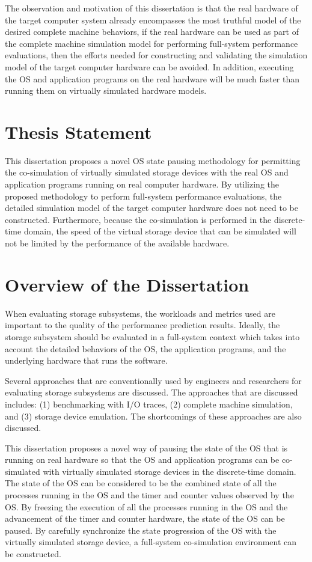 The observation and motivation of this dissertation is that the real hardware of the target computer system already encompasses the most truthful model of the desired complete machine behaviors, if the real hardware can be used as part of the complete machine simulation model for performing full-system performance evaluations, then the efforts needed for constructing and validating the simulation model of the target computer hardware can be avoided. In addition, executing the OS and application programs on the real hardware will be much faster than running them on virtually simulated hardware models.

\section{Thesis Statement}

This dissertation proposes a novel OS state pausing methodology for permitting the co-simulation of virtually simulated storage devices with the real OS and application programs running on real computer hardware. By utilizing the proposed methodology to perform full-system performance evaluations, the detailed simulation model of the target computer hardware does not need to be constructed. Furthermore, because the co-simulation is performed in the discrete-time domain, the speed of the virtual storage device that can be simulated will not be limited by the performance of the available hardware.

\section{Overview of the Dissertation}

When evaluating storage subsystems, the workloads and metrics used are important to the quality of the performance prediction results. Ideally, the storage subsystem should be evaluated in a full-system context which takes into account the detailed behaviors of the OS, the application programs, and the underlying hardware that runs the software.

Several approaches that are conventionally used by engineers and researchers for evaluating storage subsystems are discussed. The approaches that are discussed includes: (1) benchmarking with I/O traces, (2) complete machine simulation, and (3) storage device emulation. The shortcomings of these approaches are also discussed.

This dissertation proposes a novel way of pausing the state of the OS that is running on real hardware so that the OS and application programs can be co-simulated with virtually simulated storage devices in the discrete-time domain. The state of the OS can be considered to be the combined state of all the processes running in the OS and the timer and counter values observed by the OS. By freezing the execution of all the processes running in the OS and the advancement of the timer and counter hardware, the state of the OS can be paused. By carefully synchronize the state progression of the OS with the virtually simulated storage device, a full-system co-simulation environment can be constructed.

